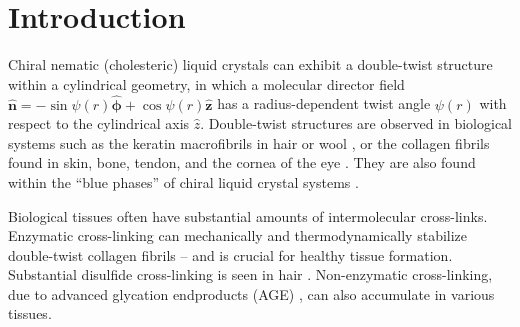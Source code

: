 \documentclass[twoside,twocolumn,9pt]{article}
\begin{document}
\newcommand{\n}{\hat{\boldsymbol{n}}}
\newcommand{\no}{{\boldsymbol{\hat{n}_0}}}
\newcommand{\strain}{\boldsymbol{\underline{\underline{\lambda}}}}
\newcommand{\xlink}{\boldsymbol{\underline{\underline{\ell}}}}
\newcommand{\lo}{\boldsymbol{\underline{\underline{\ell}}}_0}
\newcommand{\infstrain}{\boldsymbol{\underline{\underline{\epsilon}}}}
\newcommand{\stress}{\boldsymbol{\underline{\underline{\sigma}}}}

\section{Introduction}
Chiral nematic (cholesteric) liquid crystals can exhibit a double-twist structure within a cylindrical geometry, in which a molecular director field $\n = -\sin\psi(r) \boldsymbol{\hat{\phi}} + \cos\psi(r) \boldsymbol{\hat{z}}$ has a radius-dependent twist angle $\psi(r)$ with respect to the cylindrical axis $\hat{z}$. Double-twist structures are observed in biological systems such as the keratin macrofibrils in hair or wool \cite{Bryson:2009, Harland:2011}, or the collagen fibrils found in skin, bone, tendon, and the cornea of the eye \cite{Sherman:2015, Raspanti:2018}. They are also found within the ``blue phases'' of chiral liquid crystal systems \cite{Wright:1989}. 

Biological tissues often have substantial amounts of intermolecular cross-links. Enzymatic cross-linking can mechanically \cite{Eekhoff:2018} and thermodynamically \cite{Leighton:2021a} stabilize double-twist collagen fibrils -- and is crucial for healthy tissue formation. Substantial disulfide cross-linking is seen in hair \cite{Matoltsy:1976}.  Non-enzymatic cross-linking, due to advanced glycation endproducts (AGE) \cite{Gautieri:2017}, can also accumulate in various tissues.
\end{document}
